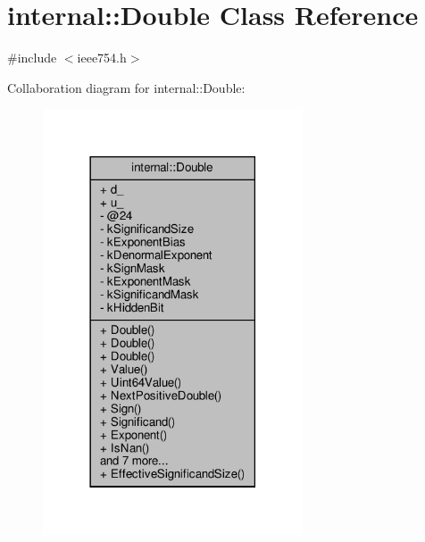 \hypertarget{classinternal_1_1Double}{}\section{internal\+:\+:Double Class Reference}
\label{classinternal_1_1Double}


{\ttfamily \#include $<$ieee754.\+h$>$}



Collaboration diagram for internal\+:\+:Double\+:
\nopagebreak
\begin{figure}[H]
\begin{center}
\leavevmode
\includegraphics[width=218pt]{classinternal_1_1Double__coll__graph}
\end{center}
\end{figure}
